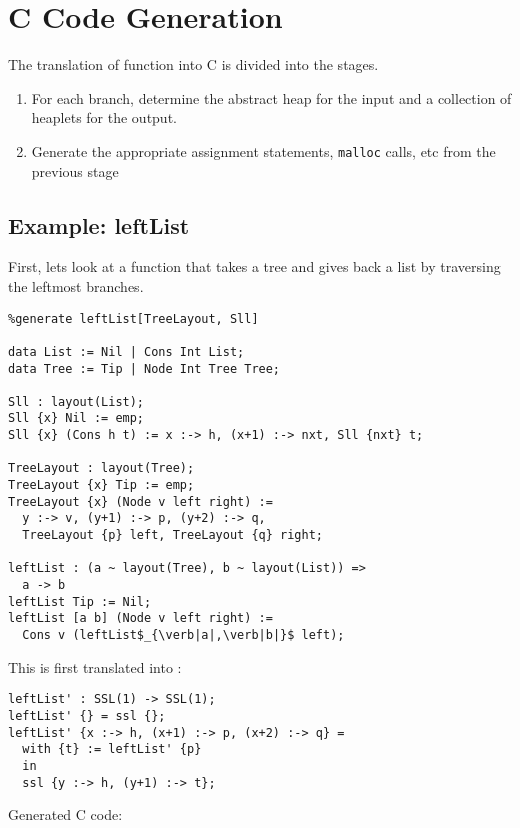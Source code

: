 \section{C Code Generation}

The translation of \PikaCore{} function into C is divided into the stages.

\begin{enumerate}
  \item \label{stage:in-out} For each branch, determine the abstract heap for the input and a collection of
    heaplets for the output.
  \item Generate the appropriate assignment statements, \verb|malloc| calls, etc from the
    previous stage
\end{enumerate}

\subsection{Example: leftList}
First, lets look at a \Pika{} function that takes a tree and gives back a list by traversing the leftmost branches.

\begin{lstlisting}
%generate leftList[TreeLayout, Sll]

data List := Nil | Cons Int List;
data Tree := Tip | Node Int Tree Tree;

Sll : layout(List);
Sll {x} Nil := emp;
Sll {x} (Cons h t) := x :-> h, (x+1) :-> nxt, Sll {nxt} t;

TreeLayout : layout(Tree);
TreeLayout {x} Tip := emp;
TreeLayout {x} (Node v left right) :=
  y :-> v, (y+1) :-> p, (y+2) :-> q,
  TreeLayout {p} left, TreeLayout {q} right;

leftList : (a ~ layout(Tree), b ~ layout(List)) =>
  a -> b
leftList Tip := Nil;
leftList [a b] (Node v left right) :=
  Cons v (leftList$_{\verb|a|,\verb|b|}$ left);
\end{lstlisting}

\noindent
This is first translated into \PikaCore:

\begin{lstlisting}
leftList' : SSL(1) -> SSL(1);
leftList' {} = ssl {};
leftList' {x :-> h, (x+1) :-> p, (x+2) :-> q} =
  with {t} := leftList' {p}
  in
  ssl {y :-> h, (y+1) :-> t};
\end{lstlisting}

\noindent
Generated C code:

